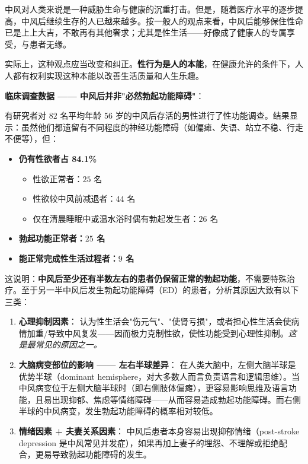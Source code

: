 \vspace{0.5em}
中风对人类来说是一种威胁生命与健康的沉重打击。但是，随着医疗水平的逐步提高，中风后继续生存的人已越来越多。按一般人的观点来看，中风后能够保住性命已是上上大吉，不敢再有其他奢求；尤其是性生活——好像成了健康人的专属享受，与患者无缘。

实际上，这种观点应当改变和纠正。\textbf{性行为是人的本能}，在健康允许的条件下，人人都有权利实现这种本能以改善生活质量和人生乐趣。

\vspace{0.5em}
\noindent\textbf{临床调查数据 —— 中风后并非"必然勃起功能障碍"}：

有研究者对 $82$ 名平均年龄 56 岁的中风后存活的男性进行了性功能调查。结果显示：虽然他们都遗留有不同程度的神经功能障碍（如偏瘫、失语、站立不稳、行走不便等），但：
\begin{itemize}
	\item \textbf{仍有性欲者占 84.1\%}
	\begin{itemize}
		\item 性欲正常者：$25$ 名
		\item 性欲较中风前减退者：$44$ 名
		\item 仅在清晨睡眠中或温水浴时偶有勃起发生者：$26$ 名
	\end{itemize}
	\item \textbf{勃起功能正常者：$25$ 名}
	\item \textbf{能正常完成性生活过程者：$9$ 名}
\end{itemize}

这说明：\textbf{中风后至少还有半数左右的患者仍保留正常的勃起功能}，不需要特殊治疗。至于另一半中风后发生勃起功能障碍（ED）的患者，分析其原因大致有以下三类：

\begin{enumerate}
	\item \textbf{心理抑制因素}：
	认为性生活会"伤元气"、"使肾亏损"，或者担心性生活会使病情加重/导致中风复发——因而极力克制性欲，使性功能受到心理性抑制。\textit{这是最常见的原因之一。}

	\item \textbf{大脑病变部位的影响 —— 左右半球差异}：
	在人类大脑中，左侧大脑半球是优势半球（dominant hemisphere，对大多数人而言负责语言和逻辑思维）。当中风病变位于左侧大脑半球时（即右侧肢体偏瘫），更容易影响思维及语言功能，且易出现抑郁、焦虑等情绪障碍——从而容易造成勃起功能障碍。而右侧半球的中风病变，发生勃起功能障碍的概率相对较低。

	\item \textbf{情绪因素 + 夫妻关系因素}：
	中风后患者本身容易出现抑郁情绪（post-stroke depression 是中风常见并发症），如果再加上妻子的埋怨、不理解或拒绝配合，更易导致勃起功能障碍的发生。
\end{enumerate}

